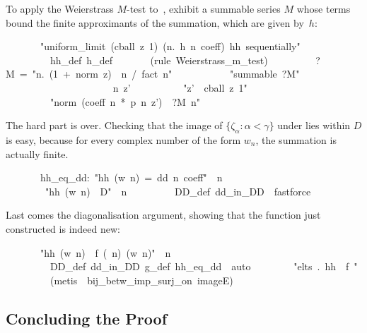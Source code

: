 \documentclass[runningheads]{llncs}
\begin{document}
To apply the Weierstrass $M$-test to~, exhibit a summable series $M$ whose terms bound the finite approximants of the summation, which are given by~$h$:
\begin{isabelle}
\ \ \ \ \ \ \ "uniform\_limit\ (cball\ z\ 1)\ (\isasymlambda n.\ h\ n\ coeff)\ hh\ sequentially"\isanewline
\ \ \ \ \ \ \ \ \ hh\_def\ h\_def\isanewline
\ \ \ \ \ \ \ (rule\ Weierstrass\_m\_test)\isanewline
\ \ \ \ \ \ \ \ \ ?M\ =\ "\isasymlambda n.\ (1\ +\ norm\ z)\ \isacharcircum \ n\ /\ fact\ n"\isanewline
\ \ \ \ \ \ \ \ \ \ \ "summable\ ?M"\isanewline
\ \ \ \ \ \ \ \ \ \ \ \ \prf\isanewline
\ \ \ \ \ \ \ \ \ n\ z'\isanewline
\ \ \ \ \ \ \ \ \ \ "z'\ \isasymin \ cball\ z\ 1"\isanewline
\ \ \ \ \ \ \ \ \ "norm\ (coeff\ n\ *\ p\ n\ z')\ \isasymle \ ?M\ n"\isanewline
\ \ \ \ \ \ \ \ \ \ \prf\isanewline
\ \ \ \ \ \ 
\end{isabelle}
%
The hard part is over. Checking that the image of $\{\zeta_\alpha : \alpha < \gamma\}$ under  lies within $D$ is easy, because for every complex number of the form $w_n$, the summation is actually finite.
\begin{isabelle}
\ \ \ \ \ \ \ hh\_eq\_dd:\ "hh\ (w\ n)\ =\ dd\ n\ coeff"\ \ n\isanewline
\ \ \ \ \ \ \ \ \prf\isanewline
\ \ \ \ \ \ \ \ "hh\ (w\ n)\ \isasymin \ D"\ \ n\isanewline
\ \ \ \ \ \ \ \ \ DD\_def\ dd\_in\_DD\ \ fastforce
\end{isabelle}

Last comes the diagonalisation argument, showing that the function just constructed is indeed new:
\begin{isabelle}
\ \ \ \ \ \ \ "hh\ (w\ n)\ \isasymnoteq \ f\ (\isasymeta \ n)\ (w\ n)"\ \ n\isanewline
\ \ \ \ \ \ \ \ \ DD\_def\ dd\_in\_DD\ g\_def\ hh\_eq\_dd\ \ auto\isanewline
\ \ \ \ \ \ \ \ "\isasymforall \isasymbeta \isasymin elts\ \isasymgamma .\ hh\ \isasymnoteq \ f\ \isasymbeta "\isanewline
\ \ \ \ \ \ \ \ \ (metis\ \isasymeta \ bij\_betw\_imp\_surj\_on\ imageE)
\end{isabelle}

\subsection{Concluding the Proof}
\end{document}
